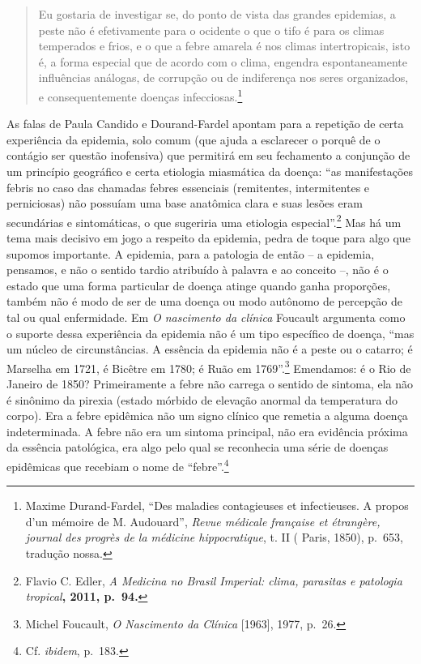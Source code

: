 \begin{quote}
Eu gostaria de investigar se, do ponto de vista das grandes epidemias, a
peste não é efetivamente para o ocidente o que o tifo é para os climas
temperados e frios, e o que a febre amarela é nos climas intertropicais,
isto é, a forma especial que de acordo com o clima, engendra
espontaneamente influências análogas, de corrupção ou de indiferença nos
seres organizados, e consequentemente doenças infecciosas.\footnote{Maxime
  Durand-Fardel, ``Des maladies contagieuses et infectieuses. A propos
  d'un mémoire de M. Audouard'', \emph{Revue médicale française et
  étrangère, journal des progrès de la médicine hippocratique}, t. II (
  Paris, 1850), p.~653, tradução nossa.}
\end{quote}

As falas de Paula Candido e Dourand-Fardel apontam para a repetição de
certa experiência da epidemia, solo comum (que ajuda a esclarecer o
porquê de o contágio ser questão inofensiva) que permitirá em seu
fechamento a conjunção de um princípio geográfico e certa etiologia
miasmática da doença: ``as manifestações febris no caso das chamadas
febres essenciais (remitentes, intermitentes e perniciosas) não possuíam
uma base anatômica clara e suas lesões eram secundárias e sintomáticas,
o que sugeriria uma etiologia especial''.\footnote{Flavio C. Edler,
  \emph{A Medicina no Brasil Imperial: clima, parasitas e patologia
  tropical}\textbf{, 2011, p.~94.}} Mas há um tema mais decisivo em jogo
a respeito da epidemia, pedra de toque para algo que supomos importante.
A epidemia, para a patologia de então -- a epidemia, pensamos, e não o
sentido tardio atribuído à palavra e ao conceito --, não é o estado que
uma forma particular de doença atinge quando ganha proporções, também
não é modo de ser de uma doença ou modo autônomo de percepção de tal ou
qual enfermidade. Em \emph{O nascimento da clínica} Foucault argumenta
como o suporte dessa experiência da epidemia não é um tipo específico de
doença, ``mas um núcleo de circunstâncias. A essência da epidemia não é
a peste ou o catarro; é Marselha em 1721, é Bicêtre em 1780; é Ruão em
1769''.\footnote{Michel Foucault, \emph{O Nascimento da Clínica}
  {[}1963{]}, 1977, p.~26.} Emendamos: é o Rio de Janeiro de 1850?
Primeiramente a febre não carrega o sentido de sintoma, ela não é
sinônimo da pirexia (estado mórbido de elevação anormal da temperatura
do corpo). Era a febre epidêmica não um signo clínico que remetia a
alguma doença indeterminada. A febre não era um sintoma principal, não
era evidência próxima da essência patológica, era algo pelo qual se
reconhecia uma série de doenças epidêmicas que recebiam o nome de
``febre''.\footnote{Cf. \emph{ibidem}, p.~183.}

